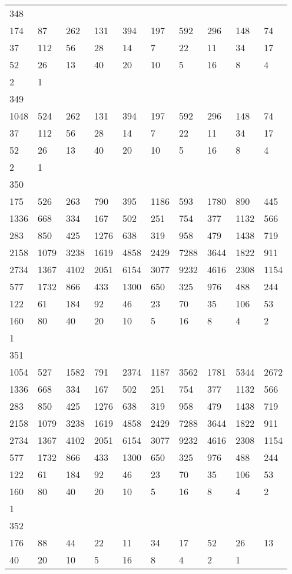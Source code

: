 \begin{longtable}{*{10}{l}}
348&&&&&&&&&\\
174& 87& 262& 131& 394& 197& 592& 296& 148& 74\\
37& 112& 56& 28& 14& 7& 22& 11& 34& 17\\
52& 26& 13& 40& 20& 10& 5& 16& 8& 4\\
2& 1& \\

349&&&&&&&&&\\
1048& 524& 262& 131& 394& 197& 592& 296& 148& 74\\
37& 112& 56& 28& 14& 7& 22& 11& 34& 17\\
52& 26& 13& 40& 20& 10& 5& 16& 8& 4\\
2& 1& \\

350&&&&&&&&&\\
175& 526& 263& 790& 395& 1186& 593& 1780& 890& 445\\
1336& 668& 334& 167& 502& 251& 754& 377& 1132& 566\\
283& 850& 425& 1276& 638& 319& 958& 479& 1438& 719\\
2158& 1079& 3238& 1619& 4858& 2429& 7288& 3644& 1822& 911\\
2734& 1367& 4102& 2051& 6154& 3077& 9232& 4616& 2308& 1154\\
577& 1732& 866& 433& 1300& 650& 325& 976& 488& 244\\
122& 61& 184& 92& 46& 23& 70& 35& 106& 53\\
160& 80& 40& 20& 10& 5& 16& 8& 4& 2\\
1& \\

351&&&&&&&&&\\
1054& 527& 1582& 791& 2374& 1187& 3562& 1781& 5344& 2672\\
1336& 668& 334& 167& 502& 251& 754& 377& 1132& 566\\
283& 850& 425& 1276& 638& 319& 958& 479& 1438& 719\\
2158& 1079& 3238& 1619& 4858& 2429& 7288& 3644& 1822& 911\\
2734& 1367& 4102& 2051& 6154& 3077& 9232& 4616& 2308& 1154\\
577& 1732& 866& 433& 1300& 650& 325& 976& 488& 244\\
122& 61& 184& 92& 46& 23& 70& 35& 106& 53\\
160& 80& 40& 20& 10& 5& 16& 8& 4& 2\\
1& \\

352&&&&&&&&&\\
176& 88& 44& 22& 11& 34& 17& 52& 26& 13\\
40& 20& 10& 5& 16& 8& 4& 2& 1& \\


\end{longtable}

